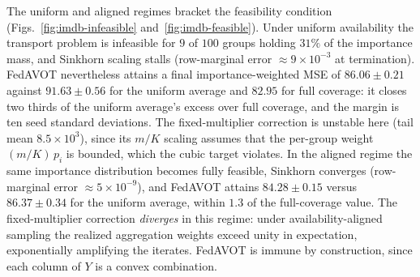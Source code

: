 \documentclass[9pt]{extarticle}
\theoremstyle{definition}
\begin{document}
The uniform and aligned regimes bracket the feasibility condition
(Figs.~\ref{fig:imdb-infeasible} and~\ref{fig:imdb-feasible}). Under
uniform availability the transport problem is infeasible for $9$ of $100$
groups holding $31\%$ of the importance mass, and Sinkhorn scaling stalls
(row-marginal error ${\approx}9\times10^{-3}$ at termination). FedAVOT
nevertheless attains a final importance-weighted MSE of $86.06 \pm 0.21$
against $91.63 \pm 0.56$ for the uniform average and $82.95$ for full
coverage: it closes two thirds of the uniform average's excess over full
coverage, and the margin is ten seed standard deviations. The
fixed-multiplier correction is unstable here (tail mean $8.5\times10^{3}$),
since its $m/K$ scaling assumes that the per-group weight $(m/K)\,p_i$ is
bounded, which the cubic target violates. In the aligned regime the same
importance distribution becomes fully feasible, Sinkhorn converges
(row-marginal error ${\approx}5\times10^{-9}$), and FedAVOT attains
$84.28 \pm 0.15$ versus $86.37 \pm 0.34$ for the uniform average, within
$1.3$ of the full-coverage value. The fixed-multiplier correction
\emph{diverges} in this regime: under availability-aligned sampling the
realized aggregation weights exceed unity in expectation, exponentially
amplifying the iterates. FedAVOT is immune by construction, since each
column of $Y$ is a convex combination.
\end{document}
